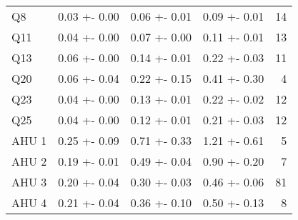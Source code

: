 \begin{longtable}{llllr}
                Q8 &       0.03 +- 0.00 &       0.06 +- 0.01 &       0.09 +- 0.01 &                  14 \\
               Q11 &       0.04 +- 0.00 &       0.07 +- 0.00 &       0.11 +- 0.01 &                  13 \\
               Q13 &       0.06 +- 0.00 &       0.14 +- 0.01 &       0.22 +- 0.03 &                  11 \\
               Q20 &       0.06 +- 0.04 &       0.22 +- 0.15 &       0.41 +- 0.30 &                   4 \\
               Q23 &       0.04 +- 0.00 &       0.13 +- 0.01 &       0.22 +- 0.02 &                  12 \\
               Q25 &       0.04 +- 0.00 &       0.12 +- 0.01 &       0.21 +- 0.03 &                  12 \\
             AHU 1 &       0.25 +- 0.09 &       0.71 +- 0.33 &       1.21 +- 0.61 &                   5 \\
             AHU 2 &       0.19 +- 0.01 &       0.49 +- 0.04 &       0.90 +- 0.20 &                   7 \\
             AHU 3 &       0.20 +- 0.04 &       0.30 +- 0.03 &       0.46 +- 0.06 &                  81 \\
             AHU 4 &       0.21 +- 0.04 &       0.36 +- 0.10 &       0.50 +- 0.13 &                   8 \\
\end{longtable}

